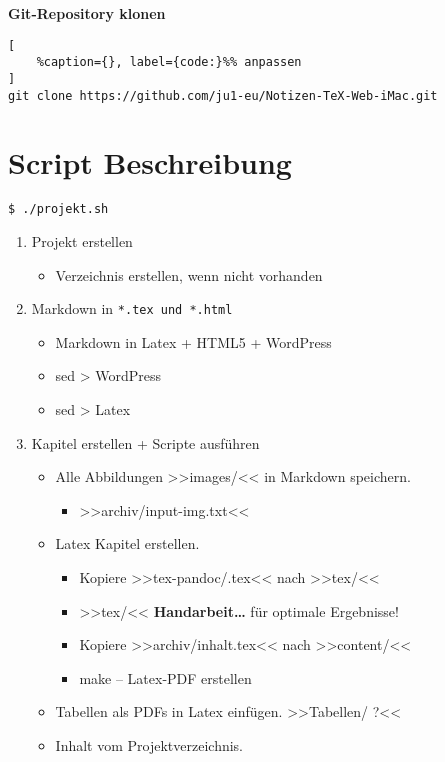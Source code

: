 \textbf{Git-Repository klonen}

\lstset{language=Bash}%
\begin{lstlisting}[
	%caption={}, label={code:}%% anpassen
]
git clone https://github.com/ju1-eu/Notizen-TeX-Web-iMac.git
\end{lstlisting}

\section{Script Beschreibung}\label{script-beschreibung}

\verb|$ ./projekt.sh|

\begin{enumerate}
\item
  Projekt erstellen

  \begin{itemize}
  \item
    Verzeichnis erstellen, wenn nicht vorhanden
  \end{itemize}
\item
  Markdown in \verb|*.tex und *.html|

  \begin{itemize}
  \item
    Markdown in Latex + HTML5 + WordPress
  \item
    sed > WordPress
  \item
    sed > Latex
  \end{itemize}
\item
  Kapitel erstellen + Scripte ausführen

  \begin{itemize}
  \item
    Alle Abbildungen >>images/<< in Markdown speichern.

    \begin{itemize}
    \item
      >>archiv/input-img.txt<<
    \end{itemize}
  \item
    Latex Kapitel erstellen.

    \begin{itemize}
    \item
      Kopiere >>tex-pandoc/.tex<< nach >>tex/<<
    \item
      >>tex/<< \textbf{Handarbeit\ldots{}} für optimale Ergebnisse!
    \item
      Kopiere >>archiv/inhalt.tex<< nach >>content/<<
    \item
      make -- Latex-PDF erstellen
    \end{itemize}
  \item
    Tabellen als PDFs in Latex einfügen. >>Tabellen/ ?<<
  \item
    Inhalt vom Projektverzeichnis.


\end{itemize}
\end{enumerate}
